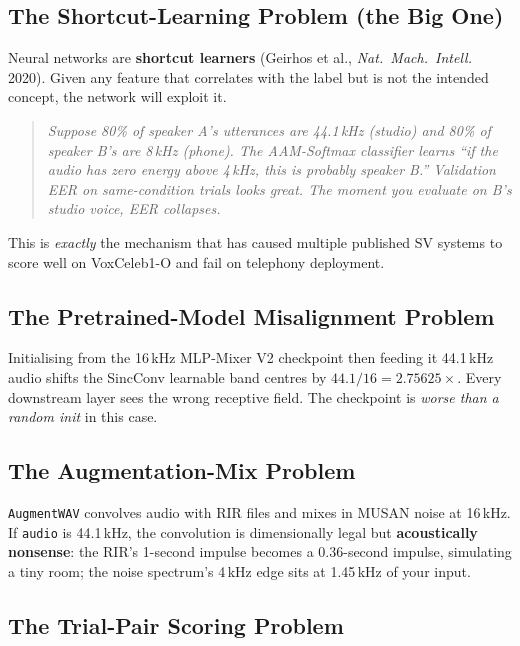 \documentclass[11pt,a4paper]{article}
\begin{document}
\subsection{The Shortcut-Learning Problem (the Big One)}

Neural networks are \textbf{shortcut learners} (Geirhos et al., \textit{Nat.\ Mach.\ Intell.}
2020). Given any feature that correlates with the label but is not the intended concept, the network
will exploit it.

\begin{quote}
\textit{Suppose 80\% of speaker A's utterances are 44.1\,kHz (studio) and 80\% of speaker B's
are 8\,kHz (phone). The AAM-Softmax classifier learns ``if the audio has zero energy above 4\,kHz,
this is probably speaker B.'' Validation EER on same-condition trials looks great. The moment you
evaluate on B's studio voice, EER collapses.}
\end{quote}

This is \emph{exactly} the mechanism that has caused multiple published SV systems to score well
on VoxCeleb1-O and fail on telephony deployment.

\subsection{The Pretrained-Model Misalignment Problem}

Initialising from the 16\,kHz MLP-Mixer V2 checkpoint then feeding it 44.1\,kHz audio shifts the
SincConv learnable band centres by $44.1/16 = 2.75625\times$. Every downstream layer sees the wrong
receptive field. The checkpoint is \emph{worse than a random init} in this case.

\subsection{The Augmentation-Mix Problem}

\texttt{AugmentWAV} convolves audio with RIR files and mixes in MUSAN noise at 16\,kHz. If
\texttt{audio} is 44.1\,kHz, the convolution is dimensionally legal but \textbf{acoustically
nonsense}: the RIR's 1-second impulse becomes a 0.36-second impulse, simulating a tiny room; the
noise spectrum's 4\,kHz edge sits at 1.45\,kHz of your input.

\subsection{The Trial-Pair Scoring Problem}
\end{document}
